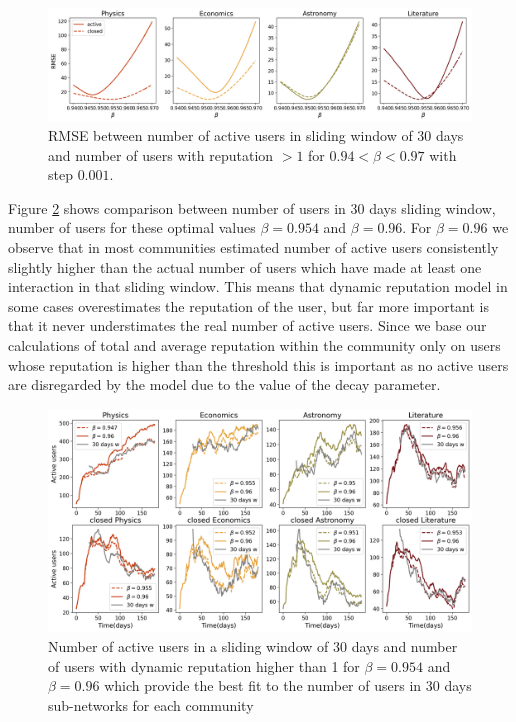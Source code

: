 \begin{figure}[h!]
	\centering
	\includegraphics[width=\linewidth]{Figures/FigA2.png}
	\caption{RMSE between number of active users in sliding window of 30 days and number of users with reputation $>1$ for  $0.94< \beta <0.97$ with step $0.001$. }
	\label{fig:rmse}
\end{figure}

Figure \ref{fig:nusers} shows comparison between number of users in 30 days sliding window, number of users for these optimal values $\beta = 0.954$ and $\beta =0.96$. For $\beta = 0.96$ we observe that in most communities estimated number of active users consistently slightly higher than the actual number of users which have made at least one interaction in that sliding window. This means that dynamic reputation model in some cases overestimates the reputation of the user, but far more important is that it never understimates the real number of active users. Since we base our calculations of total and average reputation within the community only on users whose reputation is higher than the threshold this is important as no active users are disregarded by the model due to the value of the decay parameter.

\begin{figure}[h!]
	\centering
	\includegraphics[width=\linewidth]{Figures/FigA3.png}
	\caption{Number of active users in a sliding window of 30 days and number of users with dynamic reputation higher than 1 for $\beta=0.954$ and $\beta=0.96 $ which provide the best fit to the number of users in 30 days sub-networks for each community}
	\label{fig:nusers}
\end{figure}

